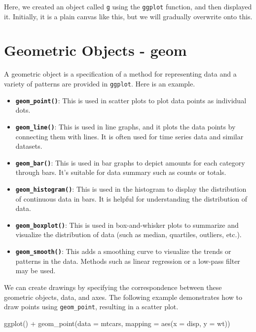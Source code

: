 \documentclass[
  a4paper,
]{book}
\newenvironment{Shaded}{\begin{snugshade}}{\end{snugshade}}
\newcommand{\AttributeTok}[1]{\textcolor[rgb]{0.40,0.45,0.13}{#1}}
\newcommand{\FunctionTok}[1]{\textcolor[rgb]{0.28,0.35,0.67}{#1}}
\newcommand{\NormalTok}[1]{\textcolor[rgb]{0.00,0.23,0.31}{#1}}
\newcommand{\SpecialCharTok}[1]{\textcolor[rgb]{0.37,0.37,0.37}{#1}}
\providecommand{\tightlist}{%
  \setlength{\itemsep}{0pt}\setlength{\parskip}{0pt}}\usepackage{longtable,booktabs,array}
\begin{document}
Here, we created an object called \texttt{g} using the \texttt{ggplot}
function, and then displayed it. Initially, it is a plain canvas like
this, but we will gradually overwrite onto this.

\section{Geometric Objects - geom}\label{geometric-objects---geom}

A geometric object is a specification of a method for representing data
and a variety of patterns are provided in \texttt{ggplot}. Here is an
example.

\begin{itemize}
\tightlist
\item
  \textbf{\texttt{geom\_point()}}: This is used in scatter plots to plot
  data points as individual dots.
\item
  \textbf{\texttt{geom\_line()}}: This is used in line graphs, and it
  plots the data points by connecting them with lines. It is often used
  for time series data and similar datasets.
\item
  \textbf{\texttt{geom\_bar()}}: This is used in bar graphs to depict
  amounts for each category through bars. It's suitable for data summary
  such as counts or totals.
\item
  \textbf{\texttt{geom\_histogram()}}: This is used in the histogram to
  display the distribution of continuous data in bars. It is helpful for
  understanding the distribution of data.
\item
  \textbf{\texttt{geom\_boxplot()}}: This is used in box-and-whisker
  plots to summarize and visualize the distribution of data (such as
  median, quartiles, outliers, etc.).
\item
  \textbf{\texttt{geom\_smooth()}}: This adds a smoothing curve to
  visualize the trends or patterns in the data. Methods such as linear
  regression or a low-pass filter may be used.
\end{itemize}

We can create drawings by specifying the correspondence between these
geometric objects, data, and axes. The following example demonstrates
how to draw points using \texttt{geom\_point}, resulting in a scatter
plot.

\begin{Shaded}
\begin{Highlighting}[]
\FunctionTok{ggplot}\NormalTok{() }\SpecialCharTok{+}
  \FunctionTok{geom\_point}\NormalTok{(}\AttributeTok{data =}\NormalTok{ mtcars, }\AttributeTok{mapping =} \FunctionTok{aes}\NormalTok{(}\AttributeTok{x =}\NormalTok{ disp, }\AttributeTok{y =}\NormalTok{ wt))}
\end{Highlighting}
\end{Shaded}
\end{document}
